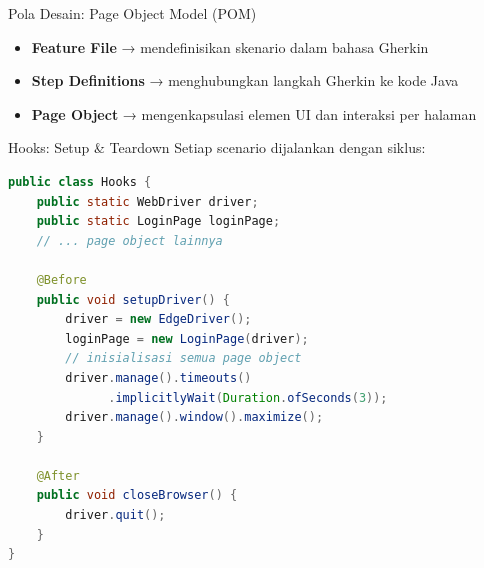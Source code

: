 \documentclass[aspectratio=169]{beamer}
\begin{document}
\begin{frame}{Pola Desain: Page Object Model (POM)}
  \begin{center}
  \end{center}

  \vspace{0.5em}
  \begin{itemize}
    \item \textbf{Feature File} → mendefinisikan skenario dalam bahasa Gherkin
    \item \textbf{Step Definitions} → menghubungkan langkah Gherkin ke kode Java
    \item \textbf{Page Object} → mengenkapsulasi elemen UI dan interaksi per halaman
  \end{itemize}
\end{frame}

\begin{frame}[fragile]{Hooks: Setup \& Teardown}
  Setiap scenario dijalankan dengan siklus:

\begin{lstlisting}[language=Java, title={Hooks.java (disederhanakan)}]
public class Hooks {
    public static WebDriver driver;
    public static LoginPage loginPage;
    // ... page object lainnya

    @Before
    public void setupDriver() {
        driver = new EdgeDriver();
        loginPage = new LoginPage(driver);
        // inisialisasi semua page object
        driver.manage().timeouts()
              .implicitlyWait(Duration.ofSeconds(3));
        driver.manage().window().maximize();
    }

    @After
    public void closeBrowser() {
        driver.quit();
    }
}
\end{lstlisting}
\end{frame}
\end{document}
